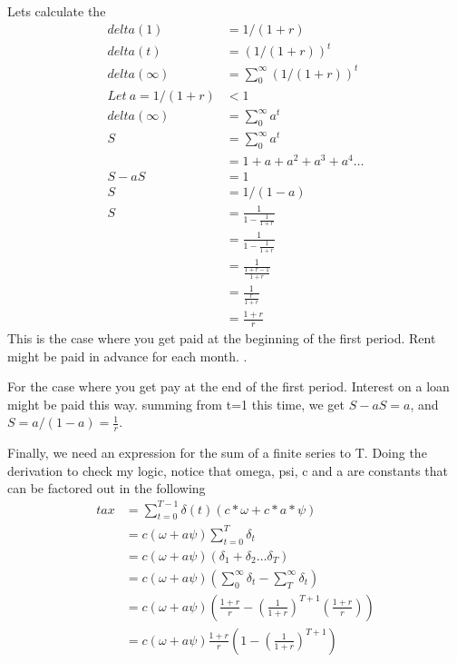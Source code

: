 Lets calculate the
\begin{align}
delta (1)   &= 1/(1+r) \\
delta (t)   &= (1/(1+r))^t \\
delta (\infty)   &= \sum_0^\infty\left(1/(1+r)\right)^t\\ 
Let\ a=1/(1+r)&<1\\
delta (\infty)   &= \sum_0^\infty a^t\\ 
S               &= \sum_0^\infty a^t\\ 
               &= 1+a+a^2+a^3+a^4 \dots\\ 
S-aS             &= 1\\ 
S             &= 1/(1-a)\\ 
S             &= \frac{1}{1-\frac{1}{1+r}}\\ 
             &= \frac{1}{1-\frac{1}{1+r}}\\ 
             &= \frac{1}{\frac{1+r-1}{1+r}}\\ 
              &= \frac{1}{\frac{r}{1+r}}\\ 
             &= \frac{1+r}{r}
\end{align}
This is the case where you get paid at the beginning of the first period. Rent might be paid in advance for each month. .

For  the case where you get pay at the end of the first period. Interest on a loan  might be paid this way.  summing from t=1 this time, we get $S-aS =a$, and $S = a/(1-a)= \frac{1}{r}$. 

 


Finally, we need an expression for the sum of a finite  series to T.  Doing the derivation to check my logic, notice that  omega, psi, c  and a are constants that can be factored out in the following
\begin{align}%
    tax&= \sum_{t=0}^{T-1} \delta(t) \left(c*\omega + c*a*\psi \right)\\
        &= c(\omega + a\psi)\sum_{t=0}^T  \delta_t\\
        &= c(\omega + a\psi)(\delta_1+\delta_2 \dots \delta_T)\\
        &= c(\omega + a\psi) \left(\sum_0^\infty \delta_t-\sum_{T}^\infty \delta_t\right)\\
        &= c(\omega + a\psi) \left(\frac{1+r}{r}  - \left(\frac{1}{1+r}\right)^{T+1} \left(\frac{1+r}{r} \right) \right)\\
        &= c(\omega + a\psi) \frac{1+r}{r}\left(1  - \left(\frac{1}{1+r}\right)^{T+1} \right)
\end{align}




